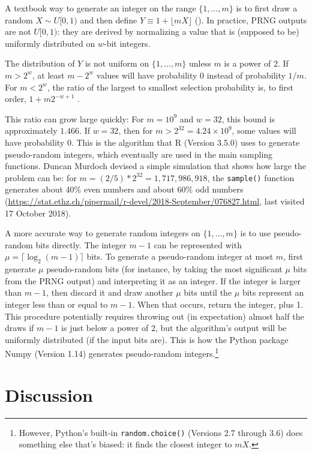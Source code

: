 \documentclass[graybox]{svmult}
\begin{document}
A textbook way to generate an integer on the range $\{1, \ldots, m\}$ is to first draw a random $X \sim U[0,1)$
and then define $Y \equiv 1 + \lfloor mX \rfloor$ (\cite{FIX_ME}). 
In practice, PRNG outputs are not $U[0,1)$: they are derived by normalizing a value that is
 (supposed to be) uniformly distributed on $w$-bit integers. 

The distribution of $Y$ is not uniform on $\{1, \ldots, m\}$ unless $m$ is a power of 2.
If $m > 2^w$, at least $m-2^w$ values will have probability 0 instead of probability $1/m$.
For $m < 2^w$, the ratio of the largest to smallest selection probability is, to first order,  $1+ m 2^{-w+1}$ \cite{knuth_art_1997}.

This ratio can grow large quickly: For $m = 10^9$ and $w=32$, this bound is approximately $1.466$. 
If $w=32$, then for $m>2^{32}=4.24 \times 10^9$, some values will have probability 0. 
This is the algorithm that R (Version 3.5.0) \cite{R_2018} uses to generate pseudo-random integers,
which eventually are used in the main sampling functions.
Duncan Murdoch devised a simple simulation that shows how large the problem can be:
for $m=  (2/5) * 2^32 = 1,717,986,918$, the \texttt{sample()} function generates about 40\% even numbers and about 60\% odd numbers (\url{https://stat.ethz.ch/pipermail/r-devel/2018-September/076827.html}, last visited 17 October 2018).
    
A more accurate way to generate random integers on $\{1, \dots, m\}$ is to use pseudo-random bits directly. 
The integer $m-1$ can be represented with $\mu = \lceil \log_2(m-1) \rceil$ bits. 
To generate a pseudo-random integer at most $m$, first generate $\mu$ pseudo-random bits (for instance, by taking the most significant $\mu$ bits from the PRNG output) and interpreting it as an integer.  
If the integer is larger than $m-1$, then discard it and draw another $\mu$ bits until the $\mu$ bits represent an integer less than or equal to $m-1$.
When that occurs, return the integer, plus 1.
This procedure potentially requires throwing out (in expectation) almost half the draws if $m-1$ is 
just below a power of $2$, but the algorithm's output will be uniformly distributed (if the input bits are).
This is how the Python package Numpy (Version 1.14) generates pseudo-random integers.\footnote{
However, Python's built-in \texttt{random.choice()} (Versions 2.7 through 3.6) does something else that's biased: it finds the closest integer to $mX$.
}


\section{Discussion}
\label{sec:discussion}
\end{document}
